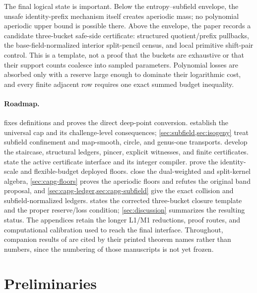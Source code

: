 \documentclass[11pt]{article}
\theoremstyle{definition}
\theoremstyle{remark}
\begin{document}
The final logical state is important.  Below the entropy--subfield envelope, the unsafe identity-prefix mechanism itself creates aperiodic mass; no polynomial aperiodic upper bound is possible there.  Above the envelope, the paper records a candidate three-bucket safe-side certificate: structured quotient/prefix pullbacks, the base-field-normalized interior split-pencil census, and local primitive shift-pair control.  This is a template, not a proof that the buckets are exhaustive or that their support counts coalesce into sampled parameters.  Polynomial losses are absorbed only with a reserve large enough to dominate their logarithmic cost, and every finite adjacent row requires one exact summed budget inequality.

\paragraph{Roadmap.}  fixes definitions and proves the direct deep-point conversion.   establish the universal cap and its challenge-level consequences; \cref{sec:subfield,sec:isogeny} treat subfield confinement and map-smooth, circle, and genus-one transports.   develop the staircase, structural ledgers, pincer, explicit witnesses, and finite certificates.   state the active certificate interface and its integer compiler.   prove the identity-scale and flexible-budget deployed floors.   close the dual-weighted and split-kernel algebra, \cref{sec:capg-floors} proves the aperiodic floors and refutes the original band proposal, and \cref{sec:capg-ledger,sec:capg-subfield} give the exact collision and subfield-normalized ledgers.   states the corrected three-bucket closure template and the proper reserve/loss condition; \cref{sec:discussion} summarizes the resulting status.  The appendices retain the longer L1/M1 reductions, proof routes, and computational calibration used to reach the final interface.  Throughout, companion results of \cite{Cho26a,Cho26b} are cited by their printed theorem names rather than numbers, since the numbering of those manuscripts is not yet frozen.

\section{Preliminaries}\label{sec:prelim}
\end{document}
